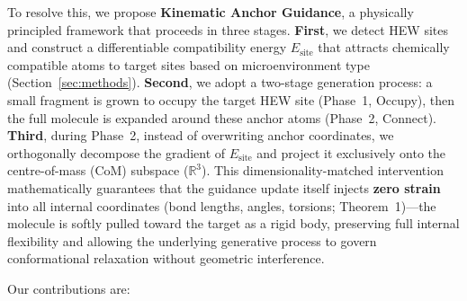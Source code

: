 \documentclass{article}
\newcommand{\reals}{\ensuremath{\mathbb{R}}}
\begin{document}
To resolve this, we propose \textbf{Kinematic Anchor Guidance}, a
physically principled framework that proceeds in three stages.
\textbf{First}, we detect HEW sites and construct a differentiable
compatibility energy $E_{\text{site}}$ that attracts chemically compatible
atoms to target sites based on microenvironment type
(Section~\ref{sec:methods}).  \textbf{Second}, we adopt a two-stage
generation process: a small fragment is grown to occupy the target
HEW site (Phase~1, Occupy), then the full molecule is expanded around
these anchor atoms (Phase~2, Connect).  \textbf{Third}, during Phase~2,
instead of overwriting anchor coordinates, we orthogonally decompose the
gradient of $E_{\text{site}}$ and project it exclusively onto the
centre-of-mass (CoM) subspace ($\reals^3$).  This dimensionality-matched
intervention mathematically guarantees that the guidance update itself
injects \textbf{zero strain} into all internal coordinates (bond lengths,
angles, torsions; Theorem~1)---the molecule is softly pulled toward
the target as a rigid body, preserving full internal flexibility and
allowing the underlying generative process to govern conformational
relaxation without geometric interference.


Our contributions are:
\end{document}
